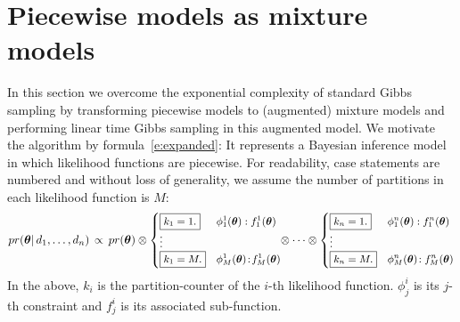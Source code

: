 \section{Piecewise models as mixture models}
\label{sect:mix}
In this section we overcome the exponential complexity of standard Gibbs
sampling by transforming piecewise models to (augmented) mixture models and performing
linear time Gibbs sampling in this augmented model.  
We motivate the algorithm by formula~\ref{e:expanded}:
It represents a Bayesian inference model in which likelihood functions are piecewise.
%
For readability, case statements are numbered and without loss of
generality, we assume the number of partitions in each
likelihood function is $M$:
\begin{align}
\label{e:expanded}
pr(\boldsymbol\theta | \, d_1, \ldots, d_n) \, 
\propto \,
pr(\boldsymbol\theta) \otimes
{\footnotesize
\begin{cases}
\boxed{k_1 = 1.} &{\phi^{1}_{1}(\boldsymbol\theta)  : f^{1}_{1}(\boldsymbol\theta)}\\
\vdots
\\
\boxed{k_1 = M.} &\phi^{1}_{M}(\boldsymbol\theta)  \!:\! f^{1}_{M}(\boldsymbol\theta)
\end{cases}
}%
\!\!
\otimes
\cdots
\otimes
{\footnotesize
\begin{cases}
\boxed{k_n = 1.} &\phi^{n}_{1}(\boldsymbol\theta)  : f^{n}_{1}(\boldsymbol\theta)\\
\vdots
\\
\boxed{k_n = M.} &\phi^{n}_{M}(\boldsymbol\theta)  \!: f^{n}_{M}(\boldsymbol\theta)
\end{cases}
}%
\end{align} 
In the above, $k_i$ is the partition-counter of the $i$-th likelihood function. 
$\phi^i_{j}$ is its $j$-th constraint and
 $f^i_{j}$ is its associated sub-function. 

